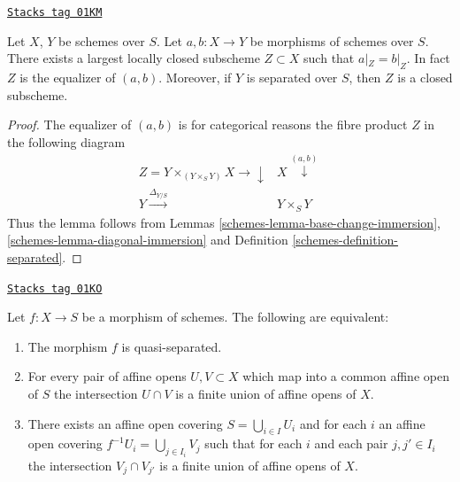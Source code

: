 \begin{lemma}
\label{schemes-lemma-where-are-they-equal}
\href{https://stacks.math.columbia.edu/tag/01KM}{\texttt{Stacks tag 01KM}}

Let $X$, $Y$ be schemes over $S$.
Let $a, b : X \to Y$ be morphisms of schemes over $S$.
There exists a largest locally closed subscheme
$Z \subset X$ such that $a|_Z = b|_Z$. In fact $Z$ is
the equalizer of $(a, b)$. Moreover, if $Y$ is separated
over $S$, then $Z$ is a closed subscheme.
\end{lemma}

\begin{proof}

The equalizer of $(a, b)$ is for categorical reasons
the fibre product $Z$ in the following diagram
$$
\begin{array}{cc}Z = Y \times_{(Y \times_S Y)} X \longrightarrow\downarrow & X \overset{(a , b)}{\downarrow} \\ Y \overset{\Delta_{Y/S}}{\longrightarrow} & Y \times_S Y\end{array}
$$
Thus the lemma follows from Lemmas
\ref{schemes-lemma-base-change-immersion}, \ref{schemes-lemma-diagonal-immersion} and
Definition \ref{schemes-definition-separated}.
\end{proof}

\begin{lemma}
\label{schemes-lemma-characterize-quasi-separated}
\href{https://stacks.math.columbia.edu/tag/01KO}{\texttt{Stacks tag 01KO}}

Let $f : X \to S$ be a morphism of schemes.
The following are equivalent:
\begin{enumerate}
\item The morphism $f$ is quasi-separated.
\item For every pair of affine opens $U, V \subset X$
which map into a common affine open of $S$ the intersection
$U \cap V$ is a finite union of affine opens of $X$.
\item There exists an affine open covering $S = \bigcup_{i \in I} U_i$
and for each $i$ an affine open covering $f^{-1}U_i = \bigcup_{j \in I_i} V_j$
such that for each $i$ and each pair $j, j' \in I_i$ the
intersection $V_j \cap V_{j'}$ is a finite union of affine
opens of $X$.
\end{enumerate}
\end{lemma}

